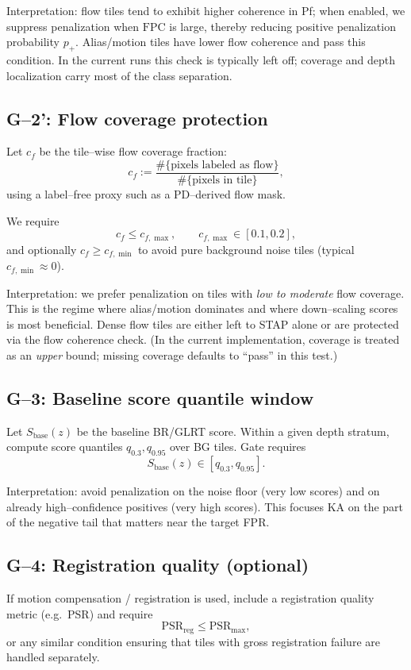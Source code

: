 \documentclass[11pt]{article}
\begin{document}
Interpretation: flow tiles tend to exhibit higher coherence in Pf; when enabled, we suppress penalization when $\mathrm{FPC}$ is large, thereby reducing positive penalization probability $p_+$. Alias/motion tiles have lower flow coherence and pass this condition. In the current runs this check is typically left off; coverage and depth localization carry most of the class separation.

\subsection{G--2': Flow coverage protection}

Let $c_f$ be the tile--wise flow coverage fraction:
\[
c_f := \frac{\#\{\text{pixels labeled as flow}\}}{\#\{\text{pixels in tile}\}},
\]
using a label--free proxy such as a PD--derived flow mask.

We require
\[
c_f \le c_{f,\max},\qquad c_{f,\max}\in[0.1,0.2],
\]
and optionally $c_f \ge c_{f,\min}$ to avoid pure background noise tiles (typical $c_{f,\min}\approx 0$).

Interpretation: we prefer penalization on tiles with \emph{low to moderate} flow coverage. This is the regime where alias/motion dominates and where down--scaling scores is most beneficial. Dense flow tiles are either left to STAP alone or are protected via the flow coherence check. (In the current implementation, coverage is treated as an \emph{upper} bound; missing coverage defaults to ``pass'' in this test.)

\subsection{G--3: Baseline score quantile window}

Let $S_{\text{base}}(z)$ be the baseline BR/GLRT score. Within a given depth stratum, compute score quantiles $q_{0.3},q_{0.95}$ over BG tiles. Gate requires
\[
S_{\text{base}}(z)\in [q_{0.3},q_{0.95}].
\]

Interpretation: avoid penalization on the noise floor (very low scores) and on already high--confidence positives (very high scores). This focuses KA on the part of the negative tail that matters near the target FPR.

\subsection{G--4: Registration quality (optional)}

If motion compensation / registration is used, include a registration quality metric (e.g.\ PSR) and require
\[
\mathrm{PSR}_{\text{reg}}\le \text{PSR}_{\max},
\]
or any similar condition ensuring that tiles with gross registration failure are handled separately.
\end{document}
